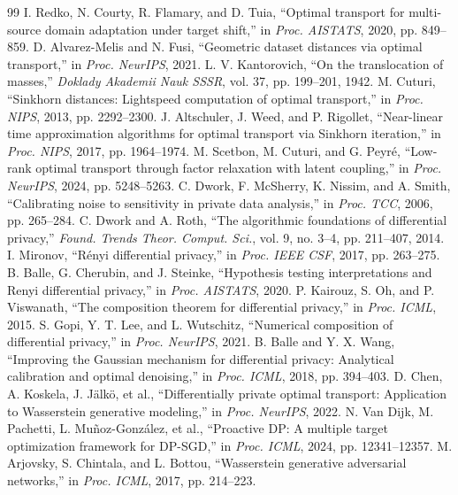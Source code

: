 \documentclass{ieeeaccess}
\theoremstyle{plain}
\theoremstyle{definition}
\theoremstyle{remark}
\begin{document}
\begin{thebibliography}{99}
 I. Redko, N. Courty, R. Flamary, and D. Tuia, ``Optimal transport for multi-source domain adaptation under target shift,'' in \textit{Proc. AISTATS}, 2020, pp. 849--859.
 D. Alvarez-Melis and N. Fusi, ``Geometric dataset distances via optimal transport,'' in \textit{Proc. NeurIPS}, 2021.
 L. V. Kantorovich, ``On the translocation of masses,'' \textit{Doklady Akademii Nauk SSSR}, vol. 37, pp. 199--201, 1942.
 M. Cuturi, ``Sinkhorn distances: Lightspeed computation of optimal transport,'' in \textit{Proc. NIPS}, 2013, pp. 2292--2300.
 J. Altschuler, J. Weed, and P. Rigollet, ``Near-linear time approximation algorithms for optimal transport via Sinkhorn iteration,'' in \textit{Proc. NIPS}, 2017, pp. 1964--1974.
 M. Scetbon, M. Cuturi, and G. Peyr\'{e}, ``Low-rank optimal transport through factor relaxation with latent coupling,'' in \textit{Proc. NeurIPS}, 2024, pp. 5248--5263.
 C. Dwork, F. McSherry, K. Nissim, and A. Smith, ``Calibrating noise to sensitivity in private data analysis,'' in \textit{Proc. TCC}, 2006, pp. 265--284.
 C. Dwork and A. Roth, ``The algorithmic foundations of differential privacy,'' \textit{Found. Trends Theor. Comput. Sci.}, vol. 9, no. 3--4, pp. 211--407, 2014.
 I. Mironov, ``R\'{e}nyi differential privacy,'' in \textit{Proc. IEEE CSF}, 2017, pp. 263--275.
 B. Balle, G. Cherubin, and J. Steinke, ``Hypothesis testing interpretations and Renyi differential privacy,'' in \textit{Proc. AISTATS}, 2020.
 P. Kairouz, S. Oh, and P. Viswanath, ``The composition theorem for differential privacy,'' in \textit{Proc. ICML}, 2015.
 S. Gopi, Y. T. Lee, and L. Wutschitz, ``Numerical composition of differential privacy,'' in \textit{Proc. NeurIPS}, 2021.
 B. Balle and Y. X. Wang, ``Improving the Gaussian mechanism for differential privacy: Analytical calibration and optimal denoising,'' in \textit{Proc. ICML}, 2018, pp. 394--403.
 D. Chen, A. Koskela, J. J\"{a}lk\"{o}, et al., ``Differentially private optimal transport: Application to Wasserstein generative modeling,'' in \textit{Proc. NeurIPS}, 2022.
 N. Van Dijk, M. Pachetti, L. Mu\~{n}oz-Gonz\'{a}lez, et al., ``Proactive DP: A multiple target optimization framework for DP-SGD,'' in \textit{Proc. ICML}, 2024, pp. 12341--12357.
 M. Arjovsky, S. Chintala, and L. Bottou, ``Wasserstein generative adversarial networks,'' in \textit{Proc. ICML}, 2017, pp. 214--223.

\end{thebibliography}
\end{document}
